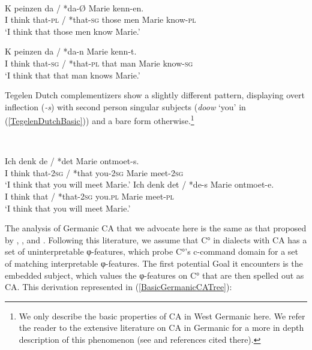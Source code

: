 \documentclass[output=paper
,modfonts
,nonflat
]{langsci/langscibook}
\begin{document}
\ea \label{InitialWestFlemishExample}
\\
\begin{xlist}

\ex \label{WestFlemishPluralAgr}
\gll K peinzen da / *da{-\O}  Marie kenn-en.\\
I 	think	that-\textsc{pl}	/	*that-\textsc{sg}	{those men}	Marie	know-\textsc{pl} \\
\glt `I think that those men know Marie.' 	

\ex \label{WestFlemishNo3rdAgr}
\gll K peinzen da\circled{-\O} / *da-n  Marie kenn-t.\\
I think that-\textsc{sg} / *that-\textsc{pl} {that man} Marie know-\textsc{sg} \\
\glt `I think that that man knows Marie.' 	

\end{xlist}

\z

Tegelen Dutch complementizers show a slightly different pattern, displaying overt inflection (\textit{-s}) with second person singular subjects (\textit{doow} `you' in (\ref{TegelenDutchBasic})) and a bare form otherwise.\footnote{We only describe the basic properties of CA in West Germanic here. We refer the reader to the extensive literature on CA in Germanic for a more in depth description of this phenomenon (see \citealt{vanKoppen:2017} and references cited there).}

\ea \label{TegelenDutch} \label{TegelenDutchBasic}
 \\
\begin{xlist}
\ex 
\gll Ich denk de / *det  Marie ontmoet-s.\\
I think that-2\textsc{sg} / *that you-2\textsc{sg} Marie meet-2\textsc{sg} \\
\glt `I think that you will meet Marie.'					
\ex 
\gll Ich denk det\circled{-\O} / *de-s  Marie ontmoet-e. \\
I think that / *that-2\textsc{sg} you.\textsc{pl} Marie meet-\textsc{pl} \\
\glt `I think that you will meet Marie.'	 
\end{xlist}
\z

The analysis of Germanic CA that we advocate here is the same as that proposed by \citet{Carstens:2003}, \citet{vanKoppen:2005}, and \citet{Haegeman:2012}. Following this literature, we assume that C° in dialects with CA has a set of uninterpretable φ-features, which probe C°’s c-command domain for a set of matching interpretable φ-features. The first potential Goal it encounters is the embedded subject, which values the φ-features on C° that are then spelled out as CA. This derivation represented in (\ref{BasicGermanicCATree}):
\end{document}
